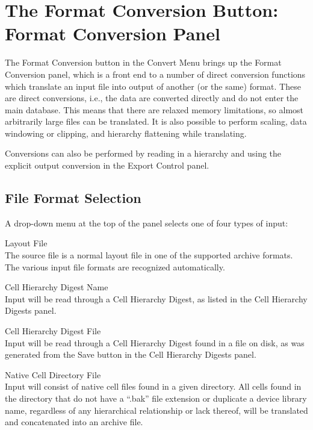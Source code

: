 \section{The {\cb Format Conversion} Button: {\cb Format Conversion} Panel}

The {\cb Format Conversion} button in the {\cb Convert Menu} brings up
the {\cb Format Conversion} panel, which is a front end to a number of
direct conversion functions which translate an input file into output
of another (or the same) format.  These are direct conversions, i.e.,
the data are converted directly and do not enter the main {\Xic}
database.  This means that there are relaxed memory limitations, so
almost arbitrarily large files can be translated.  It is also possible
to perform scaling, data windowing or clipping, and hierarchy
flattening while translating.

Conversions can also be performed by reading in a hierarchy and using
the explicit output conversion in the {\cb Export Control} panel.

\subsection{File Format Selection}

A drop-down menu at the top of the panel selects one of four
types of input:
\begin{description}
\item{\cb Layout File}\\
The source file is a normal layout file in one of the supported
archive formats.  The various input file formats are recognized
automatically.

\item{\cb Cell Hierarchy Digest Name}\\
Input will be read through a Cell Hierarchy Digest, as listed in the
{\cb Cell Hierarchy Digests} panel.

\item{\cb Cell Hierarchy Digest File}\\
Input will be read through a Cell Hierarchy Digest found in a file on
disk, as was generated from the {\cb Save} button in the {\cb Cell
Hierarchy Digests} panel.

\item{\cb Native Cell Directory File}\\
Input will consist of native cell files found in a given directory. 
All cells found in the directory that do not have a ``{\vt .bak}''
file extension or duplicate a device library name, regardless of any
hierarchical relationship or lack thereof, will be translated and
concatenated into an archive file.
\end{description}

